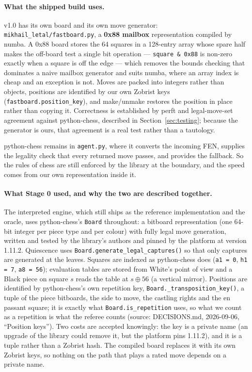 \documentclass[11pt,a4paper]{article}
\newcommand{\src}[1]{{\small(source: #1)}}
\newcommand{\code}[1]{\texttt{#1}}
\begin{document}
\paragraph{What the shipped build uses.} v1.0 has its own board and its own move generator:
\code{mikhail\_letal/fastboard.py}, a \textbf{0x88 mailbox} representation compiled by numba. A 0x88 board
stores the 64 squares in a 128-entry array whose spare half makes the off-board test a single bit
operation --- \code{square \& 0x88} is non-zero exactly when a square is off the edge --- which removes the
bounds checking that dominates a naive mailbox generator and suits numba, where an array index is cheap
and an exception is not. Moves are packed into integers rather than objects, positions are identified by
our own Zobrist keys (\code{fastboard.position\_key}), and make/unmake restores the position in place
rather than copying it. Correctness is established by perft and legal-move-set agreement against
python-chess, described in Section~\ref{sec:testing}; because the generator is ours, that agreement is a
real test rather than a tautology.

python-chess remains in \code{agent.py}, where it converts the incoming FEN, supplies the legality check
that every returned move passes, and provides the fallback. So the rules of chess are still enforced by
the library at the boundary, and the speed comes from our own representation inside it.

\paragraph{What Stage 0 used, and why the two are described together.} The interpreted engine, which still
ships as the reference implementation and the oracle, uses python-chess's \code{Board} throughout: a
bitboard representation (one 64-bit integer per piece type
and per colour) with fully legal move generation, written and tested by the library's authors and pinned
by the platform at version 1.11.2. Quiescence uses \code{Board.generate\_legal\_captures()} so that only
captures are generated at the leaves. Squares are indexed as python-chess does (\code{a1 = 0},
\code{h1 = 7}, \code{a8 = 56}); evaluation tables are stored from White's point of view and a Black piece
on square $s$ reads the table at $s \oplus 56$ (a vertical mirror). Positions are identified by
python-chess's own repetition key, \code{Board.\_transposition\_key()}, a tuple of the piece bitboards, the
side to move, the castling rights and the en passant square; it is exactly what \code{Board.is\_repetition}
uses, so what we count as a repetition is what the referee counts \src{DECISIONS.md, 2026-09-06,
``Position keys''}. Two costs are accepted knowingly: the key is a private name (an upgrade of the library
could remove it, but the platform pins 1.11.2), and it is a tuple rather than a Zobrist hash. The compiled
board replaces it with its own Zobrist keys, so nothing on the path that plays a rated move depends on a
private name.
\end{document}
